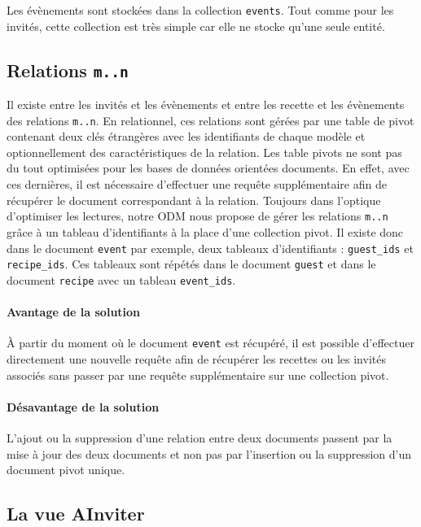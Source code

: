 		Les évènements sont stockées dans la collection \verb|events|. Tout comme pour les invités, cette collection est très simple car elle ne stocke qu'une seule entité.

	\subsection{Relations \texttt{m..n}}

		Il existe entre les invités et les évènements et entre les recette et les évènements des relations \texttt{m..n}. En relationnel, ces relations sont gérées par une table de pivot contenant deux clés étrangères avec les identifiants de chaque modèle et optionnellement des caractéristiques de la relation. Les table pivots ne sont pas du tout optimisées pour les bases de données orientées documents. En effet, avec ces dernières, il est nécessaire d'effectuer une requête supplémentaire afin de récupérer le document correspondant à la relation. Toujours dans l'optique d'optimiser les lectures, notre ODM nous propose de gérer les relations \texttt{m..n} grâce à un tableau d'identifiants à la place d'une collection pivot. Il existe donc dans le document \verb|event| par exemple, deux tableaux d'identifiants : \verb|guest_ids| et \verb|recipe_ids|. Ces tableaux sont répétés dans le document \verb|guest| et dans le document \verb|recipe| avec un tableau \verb|event_ids|.

		\paragraph{Avantage de la solution}%
			À partir du moment où le document \verb|event| est récupéré, il est possible d'effectuer directement une nouvelle requête afin de récupérer les recettes ou les invités associés sans passer par une requête supplémentaire sur une collection pivot.

		\paragraph{Désavantage de la solution}%
			L'ajout ou la suppression d'une relation entre deux documents passent par la mise à jour des deux documents et non pas par l'insertion ou la suppression d'un document pivot unique.

	\subsection{La vue AInviter}

